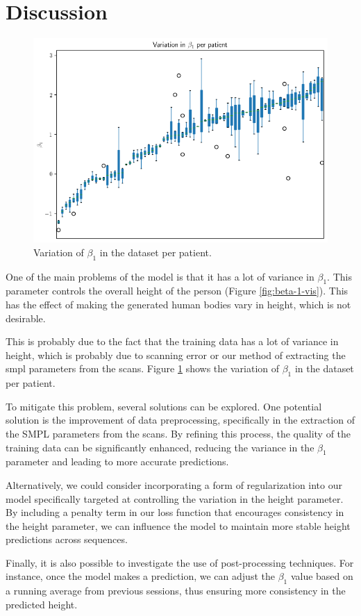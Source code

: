 \section{Discussion}

\begin{figure}[h]
    \centering
    \includegraphics[width=\textwidth]{files/beta_1_var.png}
    \caption{Variation of $\beta_1$ in the dataset per patient.}
    \label{fig:beta-var}
\end{figure}

One of the main problems of the model is that it has a lot of variance in
$\beta_1$. This parameter controls the overall height of the person (Figure
\ref{fig:beta-1-vis}). This has the effect of making the generated human bodies
vary in height, which is not desirable.

This is probably due to the fact that the training data has a lot of variance
in height, which is probably due to scanning error or our method of extracting
the \gls{smpl} parameters from the scans. Figure \ref{fig:beta-var} shows the
variation of $\beta_1$ in the dataset per patient.

To mitigate this problem, several solutions can be explored. One potential
solution is the improvement of data preprocessing, specifically in the
extraction of the SMPL parameters from the scans. By refining this process, the
quality of the training data can be significantly enhanced, reducing the
variance in the $\beta_1$ parameter and leading to more accurate predictions.

Alternatively, we could consider incorporating a form of regularization into
our model specifically targeted at controlling the variation in the height
parameter. By including a penalty term in our loss function that encourages
consistency in the height parameter, we can influence the model to maintain
more stable height predictions across sequences.

Finally, it is also possible to investigate the use of post-processing
techniques. For instance, once the model makes a prediction, we can adjust the
$\beta_1$ value based on a running average from previous sessions, thus
ensuring more consistency in the predicted height.